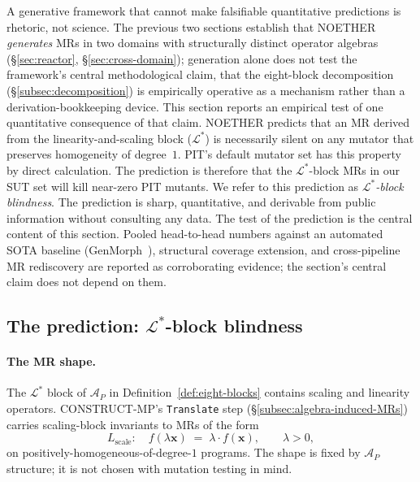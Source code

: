 A generative framework that cannot make falsifiable quantitative
predictions is rhetoric, not science. The previous two sections
establish that NOETHER \emph{generates} MRs in two domains with
structurally distinct operator algebras (\S\ref{sec:reactor},
\S\ref{sec:cross-domain}); generation alone does not test the
framework's central methodological claim, that the eight-block
decomposition (\S\ref{subsec:decomposition}) is empirically operative
as a mechanism rather than a derivation-bookkeeping device. This
section reports an empirical test of one quantitative consequence of
that claim. NOETHER predicts that an MR derived from the
linearity-and-scaling block ($\mathcal{L}^{*}$) is necessarily silent
on any mutator that preserves homogeneity of degree~$1$. PIT's default
mutator set has this property by direct calculation. The prediction
is therefore that the $\mathcal{L}^{*}$-block MRs in our SUT set will
kill near-zero PIT mutants. We refer to this prediction as
\emph{$\mathcal{L}^{*}$-block blindness}. The prediction is sharp,
quantitative, and derivable from public information without consulting
any data. The test of the prediction is the central content of this
section. Pooled head-to-head numbers against an automated SOTA
baseline (GenMorph~\cite{Ayerdi2023GenMorph}), structural coverage
extension, and cross-pipeline MR rediscovery are reported as
corroborating evidence; the section's central claim does not depend
on them.

\subsection{The prediction: \texorpdfstring{$\mathcal{L}^{*}$}{L*}-block blindness}
\label{subsec:l-blindness-derivation}

\paragraph{The MR shape.}
The $\mathcal{L}^{*}$ block of $\mathcal{A}_P$ in
Definition~\ref{def:eight-blocks} contains scaling and linearity
operators. CONSTRUCT-MP's \texttt{Translate} step
(\S\ref{subsec:algebra-induced-MRs}) carries scaling-block invariants
to MRs of the form
\begin{equation}
\label{eq:l-scale-shape}
L_{\mathrm{scale}}: \quad f(\lambda \mathbf{x}) \;=\; \lambda \cdot f(\mathbf{x}),
\qquad \lambda > 0,
\end{equation}
on positively-homogeneous-of-degree-$1$ programs. The shape is fixed
by $\mathcal{A}_P$ structure; it is not chosen with mutation testing
in mind.

